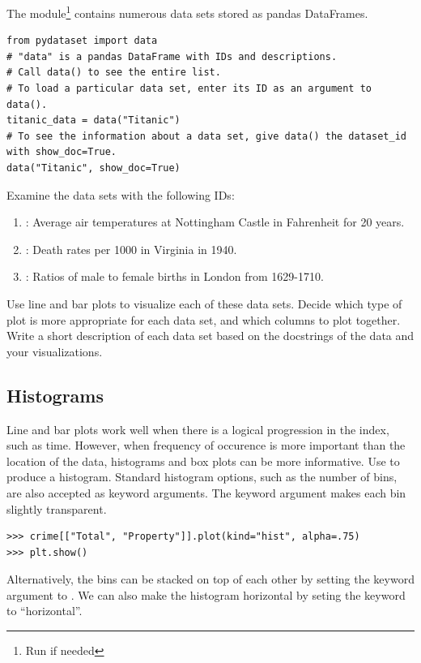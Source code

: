 \begin{problem}
\label{prob:one}
The  module\footnote{Run  if needed} contains numerous data sets stored as pandas DataFrames.
\begin{lstlisting}
from pydataset import data
# "data" is a pandas DataFrame with IDs and descriptions.
# Call data() to see the entire list.
# To load a particular data set, enter its ID as an argument to data().
titanic_data = data("Titanic")
# To see the information about a data set, give data() the dataset_id with show_doc=True.
data("Titanic", show_doc=True)
\end{lstlisting}
Examine the data sets with the following  IDs:
\begin{enumerate}
\item {}: Average air temperatures at Nottingham Castle in Fahrenheit for 20 years.
\item {}: Death rates per 1000 in Virginia in 1940.
\item {}: Ratios of male to female births in London from 1629-1710.
\end{enumerate}
Use line and bar plots to visualize each of these data sets.
Decide which type of plot is more appropriate for each data set, and which columns to plot together.
Write a short description of each data set based on the docstrings of the data and your visualizations.
\end{problem}

\subsection*{Histograms}

Line and bar plots work well when there is a logical progression in the index, such as time.
However, when frequency of occurence is more important than the location of the data, histograms and box plots can be more informative.
Use  to produce a histogram.
Standard histogram options, such as the number of bins, are also accepted as keyword arguments.
The  keyword argument makes each bin slightly transparent.

\begin{lstlisting}
>>> crime[["Total", "Property"]].plot(kind="hist", alpha=.75)
>>> plt.show()
\end{lstlisting}

Alternatively, the bins can be stacked on top of each other by setting the  keyword argument to .
We can also make the histogram horizontal by seting the keyword   to ``horizontal''.

